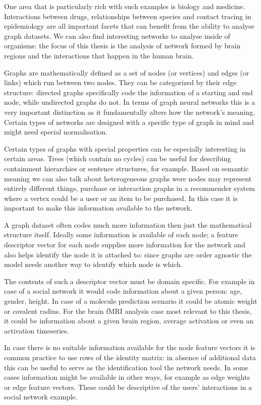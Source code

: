 	One area that is particularly rich with such examples is biology and medicine. Interactions between drugs, relationships between species and contact tracing in epidemiology are all important facets that can benefit from the ability to analyse graph datasets. We can also find interesting networks to analyse inside of organisms: the focus of this thesis is the analysis of network formed by brain regions and the interactions that happen in the human brain.
	
	Graphs are mathematically defined as a set of nodes (or vertices) and edges (or links) which run between two nodes. They can be categorized by their edge structure: directed graphs specifically code the information of a starting and end node, while undirected graphs do not. In terms of graph neural networks this is a very important distinction as it fundamentally alters how the network's meaning. Certain types of networks are designed with a specific type of graph in mind and might need special normalisation.
	
	Certain types of graphs with special properties can be especially interesting in certain areas. Trees (which contain no cycles) can be useful for describing containment hierarchies or sentence structures, for example. Based on semantic meaning we can also talk about heterogeneous graphs were nodes may represent entirely different things, purchase or interaction graphs in a recommender system where a vertex could be a user or an item to be purchased. In this case it is important to make this information available to the network.
	
	A graph dataset often codes much more information then just the mathematical structure itself. Ideally some information is available of each node; a feature descriptor vector for each node supplies more information for the network and also helps identify the node it is attached to: since graphs are order agnostic the model needs another way to identify which node is which. 
	
	The contents of such a descriptor vector must be domain specific. For example in case of a social network it would code information about a given person: age, gender, height. In case of a molecule prediction scenario it could be atomic weight or covalent radius. For the brain fMRI analysis case most relevant to this thesis, it could be information about a given brain region, average activation or even an activation timeseries.
	
	In case there is no suitable information available for the node feature vectors it is common practice to use rows of the identity matrix: in absence of additional data this can be useful to serve as the identification tool the network needs. In some cases information might be available in other ways, for example as edge weights or edge feature vectors. These could be descriptive of the users' interactions in a social network example.
	
